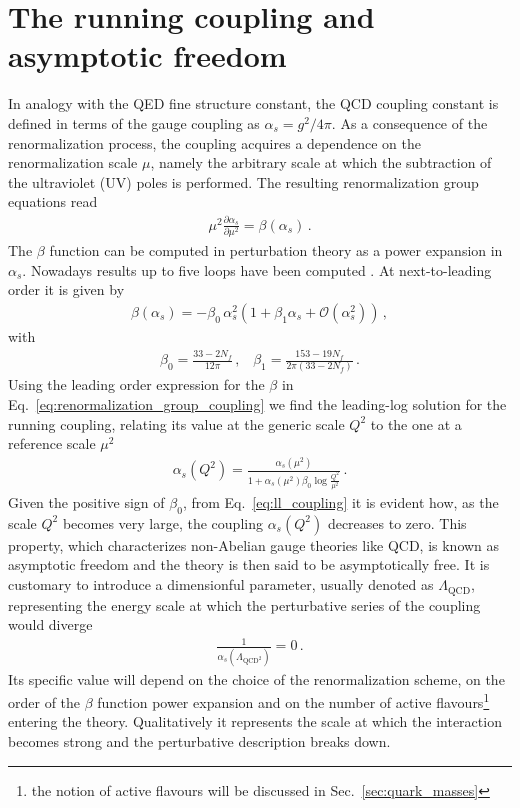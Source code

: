 \section{The running coupling and asymptotic freedom}
%
In analogy with the QED fine structure constant,
the QCD coupling constant is defined in terms of the gauge coupling as $\alpha_s = g^2/4\pi$.
As a consequence of the renormalization process, the coupling acquires a dependence on the renormalization scale $\mu$,
namely the arbitrary scale at which the subtraction of the ultraviolet (UV) poles is performed. 
The resulting renormalization group equations read
\begin{align}
    \label{eq:renormalization_group_coupling}
    \mu^2\frac{\partial\alpha_s}{\partial \mu^2} = \beta\left(\alpha_s\right)\,.
\end{align}
The $\beta$ function can be computed in perturbation theory as a power expansion in $\alpha_s$. 
Nowadays results up to five loops have been computed \cite{Herzog:2017ohr}.
At next-to-leading order it is given by
\begin{align}
    \label{eq:beta_function_expansion}
    \beta\left(\alpha_s\right) = -\beta_0\,\alpha_s^2\left(1+ \beta_1 \alpha_s + \mathcal{O}\left(\alpha_s^2\right)\right)\,,
\end{align}
with
\begin{align}
    \label{eq:beta_function_coefficients}
    \beta_0 = \frac{33 - 2 N_f}{12\pi}\,,\,\,\,\,\,
    \beta_1 = \frac{153 -19 N_f}{2\pi\left(33-2 N_f\right)}\,.
\end{align}
Using the leading order expression for the $\beta$ in Eq.~\eqref{eq:renormalization_group_coupling} we find the leading-log
solution for the running coupling, relating its value at the generic scale $Q^2$ to the one at a reference scale
$\mu^2$ 
\begin{align}
    \label{eq:ll_coupling}
    \alpha_s\left(Q^2\right) = \frac{\alpha_s\left(\mu^2\right)}{1+\alpha_s\left(\mu^2\right)\beta_0\log\frac{Q^2}{\mu^2}}\,.
\end{align}
Given the positive sign of $\beta_0$, from Eq.~\eqref{eq:ll_coupling} it is evident how, as the scale $Q^2$ becomes very large, 
the coupling $\alpha_s\left(Q^2\right)$ decreases to zero. This property, which characterizes non-Abelian gauge theories 
like QCD, is known as asymptotic freedom and the theory is then said to be asymptotically free.
It is customary to introduce a dimensionful parameter, usually denoted as $\Lambda_{\text{QCD}}$, representing the energy 
scale at which the perturbative series of the coupling would diverge
\begin{align}
    \label{eq:lambda_QCD}
    \frac{1}{\alpha_s\left(\Lambda_{\text{QCD}^2}\right)} = 0\,.
\end{align}
Its specific value will depend on the choice of the renormalization scheme, on the order
of the $\beta$ function power expansion and on the number of active flavours\footnote{the notion of active flavours will
be discussed in Sec.~\ref{sec:quark_masses}} entering the theory.
Qualitatively it represents the scale at which the interaction becomes strong and the perturbative description breaks down.

